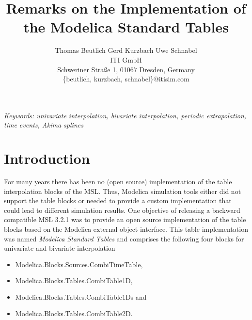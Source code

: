 \documentclass[11pt,a4paper,twocolumn]{article}
\begin{document}
\thispagestyle{empty}

%
%

\title{\textbf{Remarks on the Implementation of the Modelica Standard Tables}}
\author{Thomas Beutlich \quad Gerd Kurzbach \quad Uwe Schnabel\\
ITI GmbH\\
Schweriner Stra\ss{}e 1, 01067 Dresden, Germany\\
\{beutlich, kurzbach, schnabel\}@itisim.com}
\date{} %
\maketitle\thispagestyle{empty} %


\emph{Keywords: univariate interpolation, bivariate interpolation, periodic extrapolation, time events, Akima splines}

\section{Introduction}
For many years there has been no (open source) implementation of the table interpolation blocks of the MSL. Thus, Mod\-el\-ica simulation tools either did not support the table blocks or needed to provide a custom implementation that could lead to different simulation results. One objective of releasing a backward compatible MSL 3.2.1 was to provide an open source implementation of the table blocks based on the Mod\-el\-ica external object interface. This table implementation was named \emph{Mod\-el\-ica Standard Tables} and comprises the following four blocks for univariate and bivariate interpolation
\begin{itemize}
\item Mod\-el\-ica.Blocks.Sources.CombiTimeTable,
\item Mod\-el\-ica.Blocks.Tables.CombiTable1D,
\item Mod\-el\-ica.Blocks.Tables.CombiTable1Ds and
\item Mod\-el\-ica.Blocks.Tables.CombiTable2D.
\end{itemize}
\end{document}
